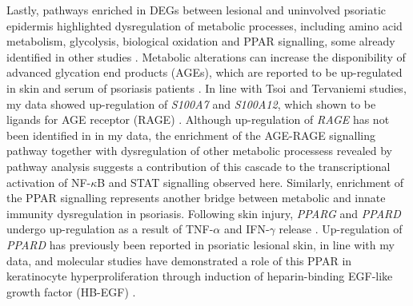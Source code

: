 Lastly, pathways enriched in DEGs between lesional and uninvolved psoriatic epidermis highlighted dysregulation of metabolic processes, including amino acid metabolism, glycolysis, biological oxidation and PPAR signalling, some already identified in other studies \parencite{Coda2012, Gudjonsson2010,Aterido2016, Tervaniemi2016}. %
Metabolic alterations can increase the disponibility of advanced glycation end products (AGEs), which are reported to be up-regulated in skin and serum of psoriasis patients \parencite{Papagrigoraki2017}. In line with Tsoi and Tervaniemi studies, my data showed up-regulation of \textit{S100A7} and \textit{S100A12}, which shown to be ligands for AGE receptor (RAGE) \parencite{Eckert2004,Moser2007,Broome2003}. Although up-regulation of \textit{RAGE} has not been identified in in my data, the enrichment of the AGE-RAGE signalling pathway together with dysregulation of other metabolic processess revealed by pathway analysis suggests a contribution of this cascade to the transcriptional activation of NF-$\kappa$B and STAT signalling observed here. Similarly, enrichment of the PPAR signalling represents another bridge between metabolic and innate immunity dysregulation in psoriasis. %
Following skin injury, \textit{PPARG} and \textit{PPARD} undergo up-regulation as a result of TNF-$\alpha$ and IFN-$\gamma$ release \parencite{Tan2001}. Up-regulation of \textit{PPARD} has previously been reported in psoriatic lesional skin, in line with my data, and molecular studies have demonstrated a role of this PPAR  in keratinocyte hyperproliferation through induction of heparin-binding EGF-like growth factor (HB-EGF) \parencite{Romanowska2008}.



